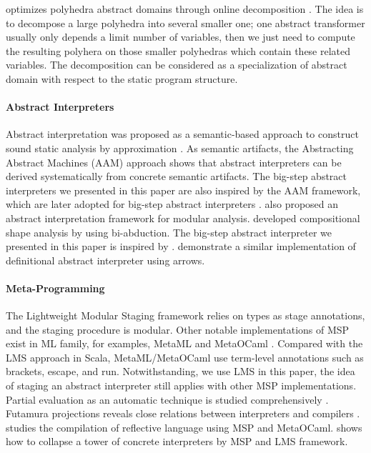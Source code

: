 \citeauthor{DBLP:conf/popl/SinghPV17} optimizes polyhedra abstract domains
through online decomposition \cite{DBLP:conf/popl/SinghPV17,
Singh:2017:PCD:3177123.3158143}. The idea is to decompose a large polyhedra into
several smaller one; one abstract transformer usually only depends a limit
number of variables, then we just need to compute the resulting polyhera on
those smaller polyhedras which contain these related variables. The decomposition
can be considered as a specialization of abstract domain with respect to the
static program structure.

\paragraph{Abstract Interpreters} Abstract interpretation was proposed as a
semantic-based approach to construct sound static analysis by approximation
\cite{DBLP:conf/popl/CousotC77}. As semantic artifacts, the Abstracting Abstract
Machines (AAM) \cite{DBLP:journals/jfp/HornM12, DBLP:conf/icfp/HornM10} approach
shows that abstract interpreters can be derived systematically from concrete
semantic artifacts. The big-step abstract interpreters we presented in this
paper are also inspired by the AAM framework, which are later adopted for
big-step abstract interpreters \cite{DBLP:journals/pacmpl/DaraisLNH17,
Wei:2018:RAA:3243631.3236800}. \cite{DBLP:conf/cc/CousotC02} also proposed an
abstract interpretation framework for modular analysis.
\citet{DBLP:conf/popl/CalcagnoDOY09} developed compositional shape analysis by
using bi-abduction. The big-step abstract interpreter we presented in this paper
is inspired by \cite{DBLP:journals/pacmpl/DaraisLNH17,
Wei:2018:RAA:3243631.3236800}. \citet{Keidel:2018:CSP:3243631.3236767}
demonstrate a similar implementation of definitional abstract interpreter using
arrows.

\paragraph{Meta-Programming} The Lightweight Modular Staging framework relies on
types as stage annotations, and the staging procedure is modular. Other notable
implementations of MSP exist in ML family, for examples, MetaML
\cite{DBLP:conf/pepm/TahaS97} and MetaOCaml \cite{DBLP:conf/gpce/CalcagnoTHL03,
DBLP:conf/flops/Kiselyov14}. Compared with the LMS approach in Scala,
MetaML/MetaOCaml use term-level annotations such as brackets, escape, and run.
Notwithstanding, we use LMS in this paper, the idea of staging an abstract
interpreter still applies with other MSP implementations. Partial evaluation as
an automatic technique is studied comprehensively
\cite{10.1007/3-540-61580-6_11, DBLP:books/daglib/0072559}. Futamura projections
reveals close relations between interpreters and compilers \cite{Futamura1999,
futamura1971partial}. \citet{DBLP:conf/gpce/Asai14} studies the compilation of
reflective language using MSP and MetaOCaml.
\citeauthor{Amin:2017:CTI:3177123.3158140} shows how to collapse a tower of
concrete interpreters by MSP and LMS framework.

